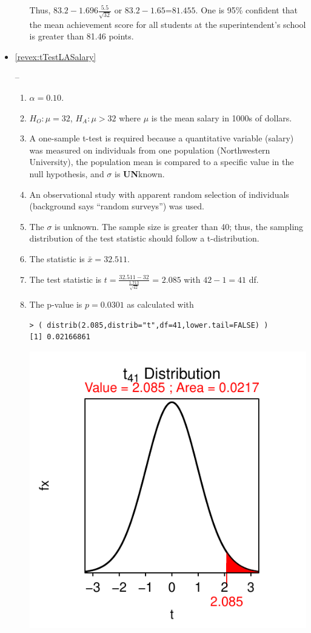 \documentclass[10pt,openany]{book}\usepackage[]{graphicx}\usepackage[]{color}
\makeatletter
\newenvironment{kframe}{%
 \def\at@end@of@kframe{}%
 \ifinner\ifhmode%
  \def\at@end@of@kframe{\end{minipage}}%
  \begin{minipage}{\columnwidth}%
 \fi\fi%
 \def\FrameCommand##1{\hskip\@totalleftmargin \hskip-\fboxsep
 \colorbox{shadecolor}{##1}\hskip-\fboxsep
     \hskip-\linewidth \hskip-\@totalleftmargin \hskip\columnwidth}%
 \MakeFramed {\advance\hsize-\width
   \@totalleftmargin\z@ \linewidth\hsize
   \@setminipage}}%
 {\par\unskip\endMakeFramed%
 \at@end@of@kframe}
\newenvironment{knitrout}{}{} %
\makeatother
\begin{document}
\begin{itemize}
\begin{enumerate}
\begin{knitrout}
\end{knitrout}
Thus, $83.2-1.696\frac{5.5}{\sqrt{32}}$ or $83.2-1.65$=$81.455$.  One is 95\% confident that the mean achievement score for all students at the superintendent's school is greater than 81.46 points.
    \end{enumerate}
  \item \hypertarget{ans:tTestLASalary}{\ref{revex:tTestLASalary}} --
    \begin{enumerate}
      \item $\alpha=0.10$.
      \item $H_{O}:\mu=32$, $H_{A}:\mu>32$ where $\mu$ is the mean salary in 1000s of dollars.
      \item A one-sample t-test is required because a quantitative variable (salary) was measured on individuals from one population (Northwestern University), the population mean is compared to a specific value in the null hypothesis, and $\sigma$ is \textbf{UN}known.
      \item An observational study with apparent random selection of individuals (background says ``random surveys'') was used.
      \item The $\sigma$ is unknown.  The sample size is greater than 40; thus, the sampling distribution of the test statistic should follow a t-distribution.
      \item The statistic is $\bar{x}=32.511$.
      \item The test statistic is $t=\frac{32.511-32}{\frac{1.713}{\sqrt{42}}}$ = $2.085$ with $42-1=41$ df.
      \item The p-value is $p=0.0301$ as calculated with
\begin{knitrout}
\color{fgcolor}\begin{kframe}
\begin{verbatim}
> ( distrib(2.085,distrib="t",df=41,lower.tail=FALSE) )
[1] 0.02166861
\end{verbatim}
\end{kframe}

{\centering \includegraphics[width=.4\linewidth]{Figs/unnamed-chunk-362-1} 

}
\end{knitrout}
\end{enumerate}
\end{itemize}
\end{document}
